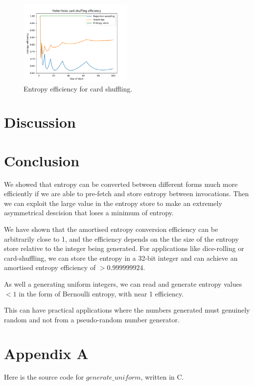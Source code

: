 \documentclass[12pt]{article}
\begin{document}
\begin{figure}[ht]
\centering
\includegraphics[width=0.5\textwidth]{shuffling_efficiency.png}
\caption{Entropy efficiency for card shuffling.}
\label{fig:shuffle}
\end{figure}






\section{Discussion}





\section{Conclusion}

We showed that entropy can be converted between different forms much more efficiently if we are able to pre-fetch and store entropy between invocations. Then we can exploit the large value in the entropy store to make an extremely asymmetrical descision that loses a minimum of entropy.

We have shown that the amortised entropy conversion efficiency can be arbitrarily close to 1, and the efficiency depends on the the size of the entropy store relative to the integer being generated. For applications like dice-rolling or card-shuffling, we can store the entropy in a 32-bit integer and can achieve an amortised entropy efficiency of $> 0.999999924$.

As well a generating uniform integers, we can read and generate entropy values $<1$ in the form of Bernoulli entropy, with near 1 efficiency.

This can have practical applications where the numbers generated must genuinely random and not from a pseudo-random number generator.

\printbibliography

\section {Appendix A}
Here is the source code for $generate\_uniform$, written in C.
\end{document}
